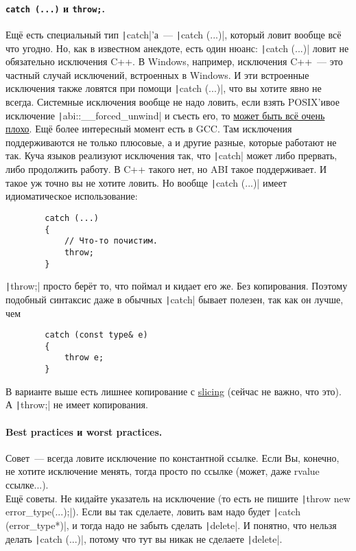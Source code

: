\documentclass{article}
\begin{document}
    \paragraph{\texttt{catch (...)} и \texttt{throw;}.}
    Ещё есть специальный тип \texttt|catch|'а~--- \texttt|catch (...)|, который ловит вообще всё что угодно. Но, как в известном анекдоте, есть один нюанс: \texttt|catch (...)| ловит не обязательно исключения C++. В Windows, например, исключения C++~--- это частный случай исключений, встроенных в Windows. И эти встроенные исключения также ловятся при помощи \texttt|catch (...)|, что вы хотите явно не всегда. Системные исключения вообще не надо ловить, если взять POSIX'ивое исключение \texttt|abi::__forced_unwind| и съесть его, то \href{https://udrepper.livejournal.com/21541.html}{может быть всё очень плохо}. Ещё более интересный момент есть в GCC. Там исключения поддерживаются не только плюсовые, а и другие разные, которые работают не так. Куча языков реализуют исключения так, что \texttt|catch| может либо прервать, либо продолжить работу. В C++ такого нет, но ABI такое поддерживает. И такое уж точно вы не хотите ловить. Но вообще \texttt|catch (...)| имеет идиоматическое использование:
    \begin{verbatim}
        catch (...)
        {
            // Что-то почистим.
            throw;
        }
    \end{verbatim}
    \texttt|throw;| просто берёт то, что поймал и кидает его же. Без копирования. Поэтому подобный синтаксис даже в обычных \texttt|catch| бывает полезен, так как он лучше, чем
    \begin{verbatim}
        catch (const type& e)
        {
            throw e;
        }
    \end{verbatim}
    В варианте выше есть лишнее копирование с \hyperref[par:slicing]{slicing} (сейчас не важно, что это). А \texttt|throw;| не имеет копирования.
    \paragraph{Best practices и worst practices.}
    Совет~--- всегда ловите исключение по константной ссылке. Если Вы, конечно, не хотите исключение менять, тогда просто по ссылке (может, даже rvalue ссылке...).\\
    Ещё советы. Не кидайте указатель на исключение (то есть не пишите \texttt|throw new error_type(...);|). Если вы так сделаете, ловить вам надо будет \texttt|catch (error_type*)|, и тогда надо не забыть сделать \texttt|delete|. И понятно, что нельзя делать \texttt|catch (...)|, потому что тут вы никак не сделаете \texttt|delete|.
\end{document}
